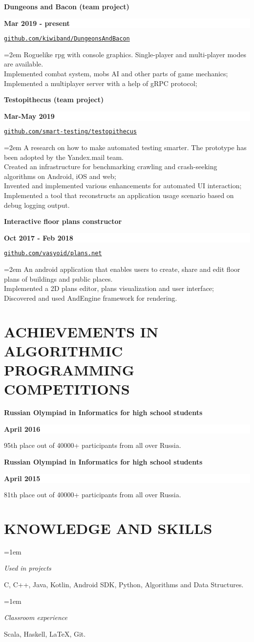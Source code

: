 \documentclass[paper=a4,fontsize=11pt]{scrartcl} %
\newlength{\spacebox}
\newcommand{\sepspace}{\vspace*{0.5em}}		%
\newcommand{\NewPart}[1]{\section*{\uppercase{#1}}}
\newcommand{\PersonalEntry}[2]{
	\noindent\hangindent=2em\hangafter=0 %
	\parbox{\spacebox}{        %
		\textit{#1}}		       %
	\hspace{1.5em} #2 \par}    %
\newcommand{\SkillsEntry}[2]{      %
	\noindent\hangindent=1em\hangafter=0 %
	\parbox{100pt}{	        %
		\textit{#1}}			   %
	\hspace{1.5em} #2 \par}    %
\newcommand{\EducationEntry}[4]{
	\noindent \textbf{#1} \hfill      %
	\colorbox{White}{%
		\parbox{8em}{%
			\hfill\color{Black}\textbf{#2}}} \par  %
	\small #4 %
	\normalsize \par}
\newcommand{\SomeEntry}[4]{
	\noindent \textbf{#1} \hfill      %
	\colorbox{White}{%
		\parbox{12em}{%
			\hfill\color{Black}\textbf{#2}}} \par  %
	\noindent \texttt{#3} \par        %
	\noindent\hangindent=2em\hangafter=0 \small #4 %
	\normalsize \par}
\begin{document}
	\SomeEntry{Dungeons and Bacon (team project)}{Mar 2019 - present}{\href{https://github.com/kiwiband/DungeonsAndBacon}{github.com/kiwiband/DungeonsAndBacon}}{Roguelike rpg with console graphics. Single-player and multi-player modes are available.\\
		Implemented combat system, mobs AI and other parts of game mechanics;\\
		Implemented a multiplayer server with a help of gRPC protocol;}
	\sepspace
	\SomeEntry{Testopithecus (team project)}{Mar-May 2019}{\href{https:/github.com/smart-testing/testopithecus}{github.com/smart-testing/testopithecus}}{A research on how to make automated testing smarter. The prototype has been adopted by the Yandex.mail team.\\
		Created an infrastructure for benchmarking crawling and crash-seeking algorithms on Android, iOS and web;\\
		Invented and implemented various enhancements for automated UI interaction;\\
		Implemented a tool that reconstructs an application usage scenario based on debug logging output.} 
	\sepspace
	\SomeEntry{Interactive floor plans constructor}{Oct 2017 - Feb 2018}{\href{https://github.com/vasyoid/plans.net}{github.com/vasyoid/plans.net}}{An android application that enables users to create, share and edit floor plans of buildings and public places.\\
		Implemented a 2D plans editor, plans visualization and user interface;\\
		Discovered and used AndEngine framework for rendering.} 
	
	\NewPart{Achievements in Algorithmic Programming Competitions}
	
	\EducationEntry{Russian Olympiad in Informatics for high school students}{April 2016}{}{95th place out of 40000+ participants from all over Russia.}
	
	\EducationEntry{Russian Olympiad in Informatics for high school students}{April 2015}{}{81th place out of 40000+ participants from all over Russia.}
	
	\NewPart{Knowledge and Skills}
	
	\SkillsEntry{Used in projects}{C, C++, Java, Kotlin, Android SDK, Python, Algorithms and Data Structures.}
	\SkillsEntry{Classroom experience}{Scala, Haskell, \LaTeX, Git.}
\end{document}

